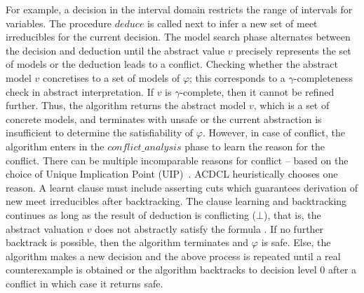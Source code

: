 For example, a decision in the interval domain restricts the range of 
intervals for variables.
The procedure $deduce$ is called next to infer a new 
set of meet irreducibles for the current decision.  The model search phase 
alternates between the decision and deduction until the abstract value $v$ 
precisely  represents the set of models or the deduction leads to a \textsf{conflict}.  
Checking whether the abstract model $v$ concretises to a set of models of $\varphi$; this corresponds to a 
$\gamma$-completeness~\cite{dhk2013-popl} check in abstract interpretation.  
If $v$ is $\gamma$-complete, then it cannot be refined further.  Thus, the 
algorithm returns the abstract model $v$, which is a set of concrete models, and terminates with \textsf{unsafe} or the 
current abstraction is insufficient to determine the satisfiability of $\varphi$.  
However, in case of \textsf{conflict}, the algorithm enters in the 
$\mathit{conflict\_analysis}$ phase to learn the reason for the conflict.  
There can be multiple incomparable reasons for conflict -- based on 
the choice of Unique Implication Point (UIP)~\cite{cdcl}.  ACDCL heuristically 
chooses one reason.  A learnt clause must include asserting cuts which 
guarantees derivation of new meet irreducibles after backtracking. The clause 
learning and backtracking continues as long as the result of deduction 
is conflicting ($\bot$), that is, the abstract valuation $v$ does not
abstractly satisfy the formula .  If no further backtrack is possible, 
then the algorithm terminates and $\varphi$ is \textsf{safe}. Else, the 
algorithm makes a new decision and the above process is repeated 
until a real counterexample  is obtained or the algorithm backtracks to 
decision level 0 after a conflict in which case it returns \textsf{safe}. 


